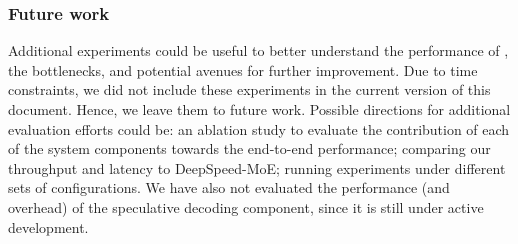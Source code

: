 \subsubsection{Future work}
Additional experiments could be useful to better understand the performance of \Project, the bottlenecks, and potential avenues for further improvement. Due to time constraints, we did not include these experiments in the current version of this document. Hence, we leave them to future work. Possible directions for additional evaluation efforts could be: an ablation study to evaluate the contribution of each of the system components towards the end-to-end performance; comparing our throughput and latency to DeepSpeed-MoE; running experiments under different sets of configurations. We have also not evaluated the performance (and overhead) of the speculative decoding component, since it is still under active development.